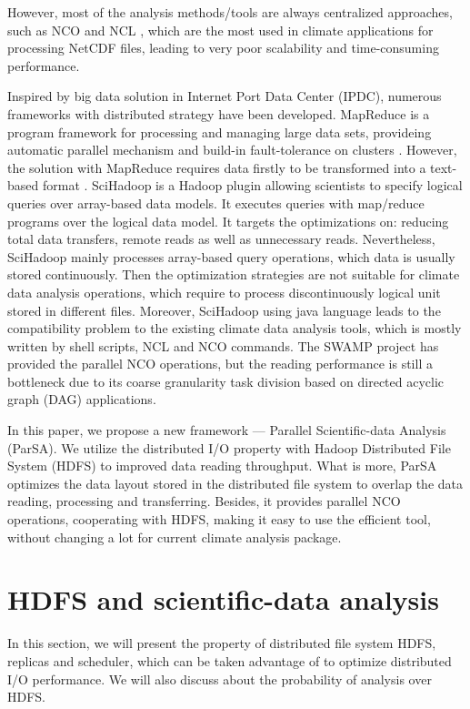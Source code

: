 \documentclass[preprint,12pt]{elsarticle}
\begin{document}
However, most of the analysis methods/tools are always centralized approaches, such as NCO \cite{zender2008analysis} and NCL \cite{ncl}, 
which are the most used in climate applications for processing NetCDF files, leading to very poor scalability and time-consuming 
performance. \par  

Inspired by big data solution in Internet Port Data Center (IPDC), numerous frameworks with distributed strategy have been developed.
MapReduce is a program framework for processing and managing large data sets, provideing automatic parallel mechanism and build-in 
fault-tolerance on clusters \cite{dean2008mapreduce}. However, the solution with MapReduce requires data firstly to be transformed into 
a text-based format \cite{zhao2010parallel}. SciHadoop \cite{buck2011scihadoop} is a Hadoop plugin allowing scientists to specify logical 
queries over array-based data models. It executes queries with map/reduce programs over the logical data model. It targets the optimizations 
on: reducing total data transfers, remote reads as well as unnecessary reads. Nevertheless, SciHadoop mainly processes array-based query 
operations,  which data is usually stored continuously. Then the optimization strategies are not suitable for climate data analysis 
operations, which require to process discontinuously logical unit stored in different files. Moreover, SciHadoop using java language leads to 
the compatibility problem to the existing climate data analysis tools, which is mostly written by shell scripts, NCL and NCO commands. The 
SWAMP project \cite{wang2008clustered} has provided the parallel NCO operations, but the reading performance is still a bottleneck due to its 
coarse granularity task division based on directed acyclic graph (DAG) applications. \par

In this paper, we propose a new framework --- Parallel Scientific-data Analysis (ParSA). We utilize the distributed I/O property with
Hadoop Distributed File System (HDFS) to improved data reading throughput. What is more, ParSA optimizes the data layout 
stored in the distributed file system to overlap the data reading, processing and transferring. Besides, it provides parallel NCO
operations, cooperating with HDFS, making it easy to use the efficient tool, without changing a lot for current climate analysis
package.

\section{HDFS and scientific-data analysis}
In this section, we will present the property of distributed file system HDFS, replicas and scheduler, which can be taken advantage
of to optimize distributed I/O performance. We will also discuss about the probability of analysis over HDFS.
\end{document}
